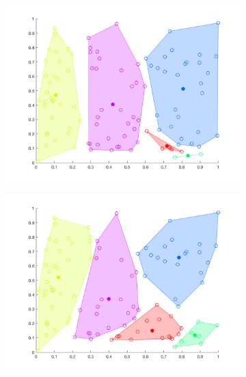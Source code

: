 \documentclass[12pt]{article}
\begin{document}
\begin{figure}[t!]
    \centering
    \begin{subfigure}[b]{0.25\textwidth}
        \includegraphics[width=\textwidth]{k-means_1}
    \end{subfigure}
    \begin{subfigure}[b]{0.25\textwidth}
        \includegraphics[width=\textwidth]{k-means_2}
    \end{subfigure}
    \begin{subfigure}[b]{0.25\textwidth}

\end{subfigure}
\end{figure}
\end{document}
